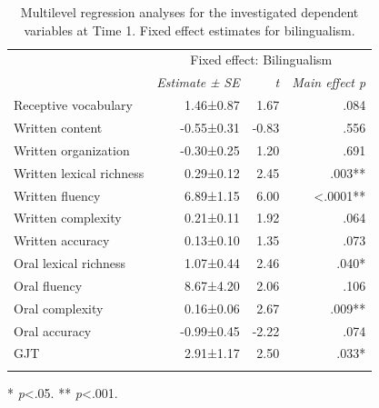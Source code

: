 \documentclass[output=paper,modfonts,nonflat,newtxmath]{langsci/langscibook}
\begin{document}
\begin{table}
	\caption{\label{tab:pfenninger:5} Multilevel regression analyses for the investigated dependent variables at Time 1. Fixed effect estimates for bilingualism.}

	\begin{tabularx}{0.85\textwidth}{l rrr}
		\lsptoprule
		& \multicolumn{3}{c}{ Fixed effect: Bilingualism}\\
		\cmidrule{2-4}
		& \textit{Estimate} \textit{±} \textit{SE} & \textit{t}  & \textit{Main effect p}\\
		\cmidrule{1-4}
		Receptive vocabulary & 1.46±0.87 & 1.67 & .084\\
		Written content & -0.55±0.31 & -0.83 & .556 \\
		Written organization & -0.30±0.25 & 1.20 & .691\\
		Written lexical richness & 0.29±0.12 & 2.45 & .003**\\
		Written fluency & 6.89±1.15 & 6.00 & <.0001**\\
		Written complexity & 0.21±0.11 & 1.92 & .064\\
		Written accuracy & 0.13±0.10 & 1.35 & .073\\
		Oral lexical richness & 1.07±0.44 & 2.46 & .040*\\
		Oral fluency & 8.67±4.20 & 2.06 & .106\\
		Oral complexity & 0.16±0.06 & 2.67 & .009**\\
		Oral accuracy & -0.99±0.45 & -2.22 & .074\\
		GJT & 2.91±1.17 & 2.50 & .033*\\
		\lspbottomrule
	\end{tabularx}

	* \textit{p}<.05.
	** \textit{p}<.001.
\end{table}
\end{document}
